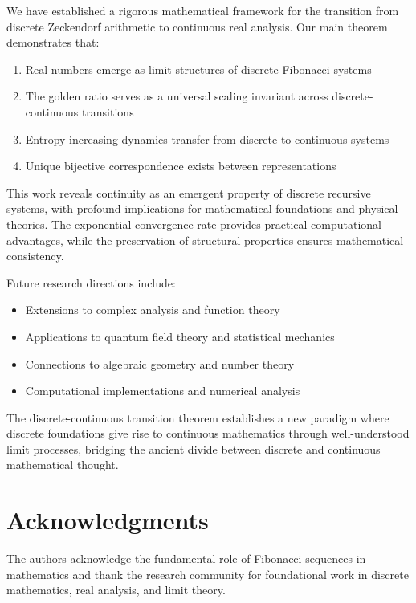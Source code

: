 \documentclass[12pt]{article}
\theoremstyle{plain}
\theoremstyle{definition}
\begin{document}
We have established a rigorous mathematical framework for the transition from discrete Zeckendorf arithmetic to continuous real analysis. Our main theorem demonstrates that:

\begin{enumerate}
\item Real numbers emerge as limit structures of discrete Fibonacci systems
\item The golden ratio serves as a universal scaling invariant across discrete-continuous transitions
\item Entropy-increasing dynamics transfer from discrete to continuous systems
\item Unique bijective correspondence exists between representations
\end{enumerate}

This work reveals continuity as an emergent property of discrete recursive systems, with profound implications for mathematical foundations and physical theories. The exponential convergence rate provides practical computational advantages, while the preservation of structural properties ensures mathematical consistency.

Future research directions include:
\begin{itemize}
\item Extensions to complex analysis and function theory
\item Applications to quantum field theory and statistical mechanics
\item Connections to algebraic geometry and number theory
\item Computational implementations and numerical analysis
\end{itemize}

The discrete-continuous transition theorem establishes a new paradigm where discrete foundations give rise to continuous mathematics through well-understood limit processes, bridging the ancient divide between discrete and continuous mathematical thought.

\section*{Acknowledgments}

The authors acknowledge the fundamental role of Fibonacci sequences in mathematics and thank the research community for foundational work in discrete mathematics, real analysis, and limit theory.
\end{document}
